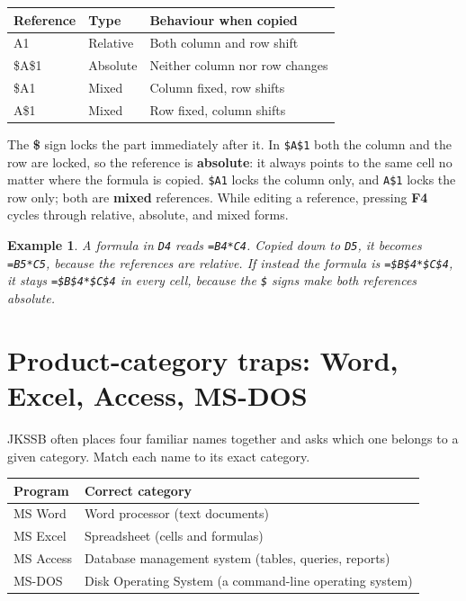\documentclass[11pt]{article}
\newtheorem{example}{Example}[section]
\begin{document}
\begin{center}
\begin{tabular}{p{}p{}p{}}
\toprule
\textbf{Reference} & \textbf{Type} & \textbf{Behaviour when copied} \\
\midrule
A1 & Relative & Both column and row shift \\
\$A\$1 & Absolute & Neither column nor row changes \\
\$A1 & Mixed & Column fixed, row shifts \\
A\$1 & Mixed & Row fixed, column shifts \\
\bottomrule
\end{tabular}
\end{center}

The \textbf{\$} sign locks the part immediately after it. In \texttt{\$A\$1}
both the column and the row are locked, so the reference is
\textbf{absolute}: it always points to the same cell no matter where the
formula is copied. \texttt{\$A1} locks the column only, and \texttt{A\$1}
locks the row only; both are \textbf{mixed} references. While editing a
reference, pressing \textbf{F4} cycles through relative, absolute, and mixed
forms.

\begin{example}
A formula in \texttt{D4} reads \texttt{=B4*C4}. Copied down to \texttt{D5}, it
becomes \texttt{=B5*C5}, because the references are relative. If instead the
formula is \texttt{=\$B\$4*\$C\$4}, it stays \texttt{=\$B\$4*\$C\$4} in
every cell, because the \texttt{\$} signs make both references absolute.
\end{example}

\section{Product-category traps: Word, Excel, Access, MS-DOS}
JKSSB often places four familiar names together and asks which one belongs to
a given category. Match each name to its exact category.

\begin{center}
\begin{tabular}{p{}p{}}
\toprule
\textbf{Program} & \textbf{Correct category} \\
\midrule
MS Word & Word processor (text documents) \\
MS Excel & Spreadsheet (cells and formulas) \\
MS Access & Database management system (tables, queries, reports) \\
MS-DOS & Disk Operating System (a command-line operating system) \\
\bottomrule
\end{tabular}
\end{center}
\end{document}

